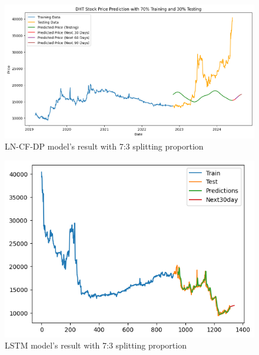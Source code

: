 \documentclass{ieeeojies}
\begin{document}
\vspace{-1em}

\begin{figure}[H]
  \centering
  \begin{minipage}{0.8\linewidth}
    \centering
    \includegraphics[width=\linewidth]{bibliography/Figure/DHT_LN_CF&DP.png}
    \caption{LN-CF-DP model's result with 7:3 splitting proportion}
    \label{fig8}
  \end{minipage}
\end{figure}

\vspace{-1em}

\begin{figure}[H]
  \centering
  \begin{minipage}{0.8\linewidth}
    \centering
    \includegraphics[width=\linewidth]{bibliography/Figure/LSTM_DHT(7_3).png}
    \caption{LSTM model's result with 7:3 splitting proportion}
    \label{fig8}
  \end{minipage}
\end{figure}
\end{document}
